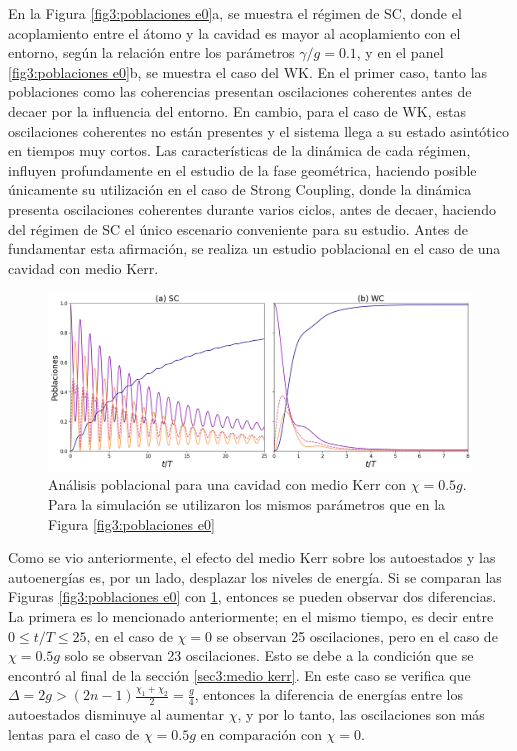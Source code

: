 En la Figura \ref{fig3:poblaciones e0}a, se muestra el régimen de SC, donde el acoplamiento entre el átomo y la cavidad es mayor al acoplamiento con el entorno, según la relación entre los parámetros $\gamma/g=0.1$, y en el panel \ref{fig3:poblaciones e0}b, se muestra el caso del WK. En el primer caso, tanto las poblaciones como las coherencias presentan oscilaciones coherentes antes de decaer por la influencia del entorno. En cambio, para el caso de WK, estas oscilaciones coherentes no están presentes y el sistema llega a su estado asintótico en tiempos muy cortos. Las características de la dinámica de cada régimen, influyen profundamente en el estudio de la fase geométrica, haciendo posible únicamente su utilización en el caso de Strong Coupling, donde la dinámica presenta oscilaciones coherentes durante varios ciclos, antes de decaer, haciendo del régimen de SC el único escenario conveniente para su estudio. Antes de fundamentar esta afirmación, se realiza un estudio poblacional en el caso de una cavidad con medio Kerr.
\begin{figure}[h]
    \centering
    \includegraphics[width=\textwidth]{figuras/ch3/poblaciones kerr.png}
    \caption{Análisis poblacional para una cavidad con medio Kerr con $\chi=0.5g$. Para la simulación se utilizaron los mismos parámetros que en la Figura \ref{fig3:poblaciones e0}}
    \label{fig3:poblaciones kerr}
\end{figure}
Como se vio anteriormente, el efecto del medio Kerr sobre los autoestados y las autoenergías es, por un lado, desplazar los niveles de energía.
Si se comparan las Figuras \ref{fig3:poblaciones e0} con \ref{fig3:poblaciones kerr}, entonces se pueden observar dos diferencias. La primera es lo mencionado anteriormente; en el mismo tiempo, es decir entre $0\leq t/T \leq 25$, en el caso de $\chi=0$ se observan 25 oscilaciones, pero en el caso de $\chi=0.5g$ solo se observan 23 oscilaciones. Esto se debe a la condición que se encontró al final de la sección \ref{sec3:medio kerr}. En este caso se verifica que $\Delta=2g>(2n-1)\frac{\chi_1+\chi_2}{2}=\frac{g}{4}$, entonces la diferencia de energías entre los autoestados disminuye al aumentar $\chi$, y por lo tanto, las oscilaciones son más lentas para el caso de $\chi=0.5g$ en comparación con $\chi=0$.

